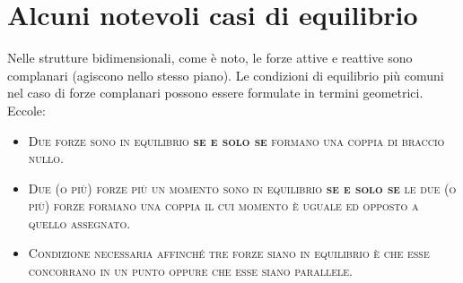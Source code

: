 \section{Alcuni notevoli casi di equilibrio}
Nelle strutture bidimensionali, come è noto, le forze attive e reattive sono complanari (agiscono nello stesso piano). Le condizioni di equilibrio più comuni nel caso di forze complanari possono essere formulate in termini geometrici. Eccole:
\begin{itemize}
\item \textsc{Due forze sono in equilibrio \textbf{se e solo se} formano una coppia di braccio nullo.}
\item \textsc{Due (o più) forze più un momento sono in equilibrio \textbf{se e solo se} le due (o più) forze formano una coppia il cui momento è uguale ed opposto a quello assegnato.}
\item \textsc{Condizione necessaria affinché tre forze siano in equilibrio è che esse concorrano in un punto oppure che esse siano parallele.}
\end{itemize}
